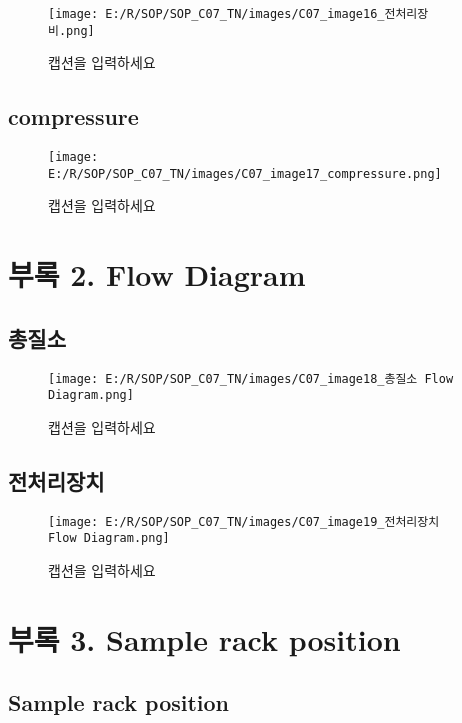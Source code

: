 \documentclass[
]{book}
\begin{document}
\begin{figure}
\centering
\texttt{[image: E:/R/SOP/SOP\_C07\_TN/images/C07\_image16\_전처리장비.png]}
\caption{캡션을 입력하세요}
\end{figure}

\hypertarget{compressure}{%
\subsection{compressure}\label{compressure}}

\begin{figure}
\centering
\texttt{[image: E:/R/SOP/SOP\_C07\_TN/images/C07\_image17\_compressure.png]}
\caption{캡션을 입력하세요}
\end{figure}

\hypertarget{uxbd80uxb85d-2.-flow-diagram-1}{%
\section{부록 2. Flow Diagram}\label{uxbd80uxb85d-2.-flow-diagram-1}}

\hypertarget{uxcd1duxc9c8uxc18c}{%
\subsection{총질소}\label{uxcd1duxc9c8uxc18c}}

\begin{figure}
\centering
\texttt{[image: E:/R/SOP/SOP\_C07\_TN/images/C07\_image18\_총질소 Flow Diagram.png]}
\caption{캡션을 입력하세요}
\end{figure}

\hypertarget{uxc804uxcc98uxb9acuxc7a5uxce58}{%
\subsection{전처리장치}\label{uxc804uxcc98uxb9acuxc7a5uxce58}}

\begin{figure}
\centering
\texttt{[image: E:/R/SOP/SOP\_C07\_TN/images/C07\_image19\_전처리장치 Flow Diagram.png]}
\caption{캡션을 입력하세요}
\end{figure}

\hypertarget{uxbd80uxb85d-3.-sample-rack-position-1}{%
\section{부록 3. Sample rack position}\label{uxbd80uxb85d-3.-sample-rack-position-1}}

\hypertarget{sample-rack-position-1}{%
\subsection{Sample rack position}\label{sample-rack-position-1}}
\end{document}
